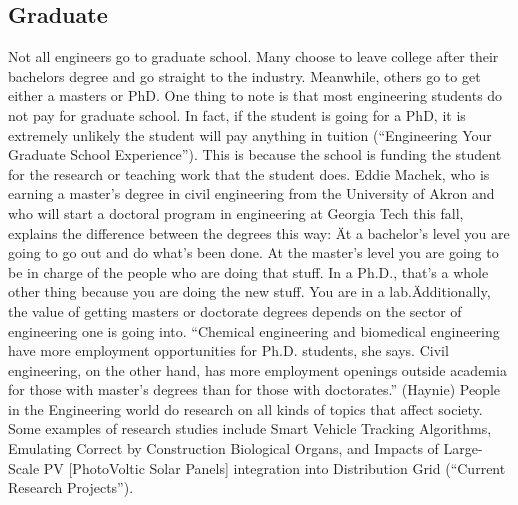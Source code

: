 \begin{multicols}{2}
    \subsection{Graduate}
        Not all engineers go to graduate school. Many choose to leave college after their bachelors degree and go straight to the industry. Meanwhile, others go to get either a masters or PhD. One thing to note is that most engineering students do not pay for graduate school. In fact, if the student is going for a PhD, it is extremely unlikely the student will pay anything in tuition (“Engineering Your Graduate School Experience”). This is because the school is funding the student for the research or teaching work that the student does. Eddie Machek, who is earning a master's degree in civil engineering from the University of Akron and who will start a doctoral program in engineering at Georgia Tech this fall, explains the difference between the degrees this way: \"At a bachelor's level you are going to go out and do what's been done. At the master's level you are going to be in charge of the people who are doing that stuff. In a Ph.D., that's a whole other thing because you are doing the new stuff. You are in a lab.\" Additionally, the value of getting masters or doctorate degrees depends on the sector of engineering one is going into. “Chemical engineering and biomedical engineering have more employment opportunities for Ph.D. students, she says. Civil engineering, on the other hand, has more employment openings outside academia for those with master’s degrees than for those with doctorates.”  (Haynie) 
        People in the Engineering world do research on all kinds of topics that affect society. Some examples of research studies include Smart Vehicle Tracking Algorithms, Emulating Correct by Construction Biological Organs, and Impacts of Large-Scale PV [PhotoVoltic Solar Panels] integration into Distribution Grid (“Current Research Projects”). 

\end{multicols}
